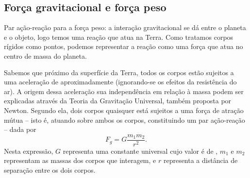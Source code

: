 \subsection{Força gravitacional e força peso} 

\begin{marginfigure}
\centering
{}
\caption{Par ação-reação para a força peso: a interação gravitacional se dá entre o planeta e o objeto, logo temos uma reação que atua na Terra. Como tratamos corpos rígidos como pontos, podemos representar a reação como uma força que atua no centro de massa do planeta.}
\end{marginfigure}
Sabemos que próximo da superfície da Terra, todos os corpos estão sujeitos a uma aceleração de aproximadamente  (ignorando-se os efeitos da resistência do ar). A origem dessa aceleração sua independência em relação à massa podem ser explicadas através da Teoria da Gravitação Universal, também proposta por Newton. Segundo ela, dois corpos quaisquer está sujeitos a uma força de atração mútua -- isto é, atuando sobre ambos os corpos, constituindo um par ação-reação -- dada por
\begin{equation}\label{Eq:LeiGravitacaoUniversal}
  F_g = G \frac{m_1 m_2}{r^2}.
\end{equation}
%
Nesta expressão, $G$ representa uma constante universal cujo valor é de , $m_1$ e $m_2$ representam as massas dos corpos que interagem, e $r$ representa a distância de separação entre os dois corpos.

